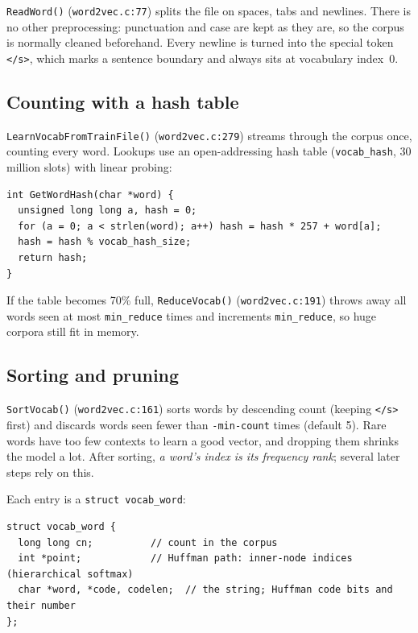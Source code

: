 \documentclass[11pt,a4paper]{article}
\newcommand{\code}[1]{\texttt{#1}}
\newcommand{\src}[1]{\texttt{word2vec.c:#1}}
\begin{document}
\code{ReadWord()} (\src{77}) splits the file on spaces, tabs and newlines. There is
no other preprocessing: punctuation and case are kept as they are, so the corpus is
normally cleaned beforehand. Every newline is turned into the special token
\code{</s>}, which marks a sentence boundary and always sits at vocabulary index~0.

\subsection{Counting with a hash table}

\code{LearnVocabFromTrainFile()} (\src{279}) streams through the corpus once,
counting every word. Lookups use an open-addressing hash table
(\code{vocab\_hash}, 30 million slots) with linear probing:

\begin{lstlisting}[firstnumber=104]
int GetWordHash(char *word) {
  unsigned long long a, hash = 0;
  for (a = 0; a < strlen(word); a++) hash = hash * 257 + word[a];
  hash = hash % vocab_hash_size;
  return hash;
}
\end{lstlisting}

If the table becomes 70\% full, \code{ReduceVocab()} (\src{191}) throws away
all words seen at most \code{min\_reduce} times and increments \code{min\_reduce},
so huge corpora still fit in memory.

\subsection{Sorting and pruning}

\code{SortVocab()} (\src{161}) sorts words by descending count (keeping
\code{</s>} first) and discards words seen fewer than \code{-min-count} times
(default 5). Rare words have too few contexts to learn a good vector, and dropping
them shrinks the model a lot. After sorting, \emph{a word's index is its frequency
rank}; several later steps rely on this.

Each entry is a \code{struct vocab\_word}:

\begin{lstlisting}[firstnumber=37]
struct vocab_word {
  long long cn;          // count in the corpus
  int *point;            // Huffman path: inner-node indices (hierarchical softmax)
  char *word, *code, codelen;  // the string; Huffman code bits and their number
};
\end{lstlisting}

\end{document}
